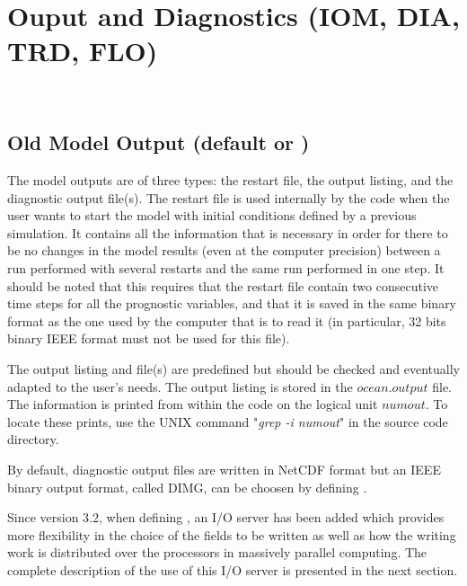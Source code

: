 \chapter{Ouput and Diagnostics (IOM, DIA, TRD, FLO)}
\label{DIA}
\minitoc

\newpage
$\ $\newline    %

\section{Old Model Output (default or )}
\label{DIA_io_old}

The model outputs are of three types: the restart file, the output listing, 
and the diagnostic output file(s). The restart file is used internally by the code when 
the user wants to start the model with initial conditions defined by a 
previous simulation. It contains all the information that is necessary in 
order for there to be no changes in the model results (even at the computer 
precision) between a run performed with several restarts and the same run 
performed in one step. It should be noted that this requires that the restart file 
contain two consecutive time steps for all the prognostic variables, and 
that it is saved in the same binary format as the one used by the computer 
that is to read it (in particular, 32 bits binary IEEE format must not be used for 
this file). 

The output listing and file(s) are predefined but should be checked 
and eventually adapted to the user's needs. The output listing is stored in 
the $ocean.output$ file. The information is printed from within the code on the 
logical unit $numout$. To locate these prints, use the UNIX command 
"\textit{grep -i numout}" in the source code directory.

By default, diagnostic output files are written in NetCDF format but an IEEE binary output format, called DIMG, can be choosen by defining . 

Since version 3.2, when defining , an I/O server has been added which provides more flexibility in the choice of the fields to be written as well as how the writing work is distributed over the processors in massively parallel computing. The complete description of the use of this I/O server is presented in the next section. 

